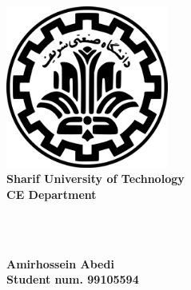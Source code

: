 \begin{titlepage}
\begin{center}
\includegraphics[width=0.4\textwidth]{resources/sharif.png}\\
        
\LARGE
\textbf{Sharif University of Technology}\\
\textbf{CE Department}\\
        
\vfill
        
\huge
\textbf{}\\
\textbf{}\\
        
\vfill
        
\LARGE
\textbf{Amirhossein Abedi}\\
\textbf{Student num. 99105594}
\end{center}
\end{titlepage}
